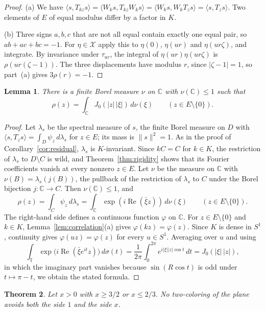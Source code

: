 \documentclass[10pt]{article}
\newtheorem{thm}{Theorem}[section]
\newtheorem{lem}[thm]{Lemma}
\theoremstyle{remark}
\newcommand{\C}{\mathbb C}
\newcommand{\T}{\mathbb T}
\DeclareMathOperator{\re}{Re}
\begin{document}
\begin{proof}
(a) We have $\langle s,T_{kz}s\rangle=\langle W_ks,T_{kz}W_ks\rangle=\langle W_ks,W_kT_zs\rangle=\langle s,T_zs\rangle$. Two elements of $E$ of equal modulus differ by a factor in $K$.

(b) Three signs $a,b,c$ that are not all equal contain exactly one equal pair, so $ab+ac+bc=-1$. For $\eta\in\mathcal X$ apply this to $\eta(0)$, $\eta(ur)$ and $\eta(ur\zeta)$, and integrate. By invariance under $\tau_{ur}$, the integral of $\eta(ur)\eta(ur\zeta)$ is $\rho(ur(\zeta-1))$. The three displacements have modulus $r$, since $|\zeta-1|=1$, so part~(a) gives $3\rho(r)=-1$.
\end{proof}

\begin{lem}\label{lem:radial}
There is a finite Borel measure $\nu$ on $\C$ with $\nu(\C)\le1$ such that
\[
 \rho(z)=\int_\C J_0(|z|\,|\xi|)\,d\nu(\xi)\qquad(z\in E\setminus\{0\}).
\]
\end{lem}

\begin{proof}
Let $\lambda_s$ be the spectral measure of $s$, the finite Borel measure on $D$ with $\langle s,T_zs\rangle=\int_D\psi_z\,d\lambda_s$ for $z\in E$; its mass is $\|s\|^2=1$. As in the proof of Corollary~\ref{cor:residual}, $\lambda_s$ is $K$-invariant. Since $kC=C$ for $k\in K$, the restriction of $\lambda_s$ to $D\setminus C$ is wild, and Theorem~\ref{thm:rigidity} shows that its Fourier coefficients vanish at every nonzero $z\in E$. Let $\nu$ be the measure on $\C$ with $\nu(B)=\lambda_s(j(B))$, the pullback of the restriction of $\lambda_s$ to $C$ under the Borel bijection $j\colon\C\to C$. Then $\nu(\C)\le1$, and
\[
 \rho(z)=\int_C\psi_z\,d\lambda_s=\int_\C\exp(i\re(\bar\xi z))\,d\nu(\xi)\qquad(z\in E\setminus\{0\}).
\]
The right-hand side defines a continuous function $\varphi$ on $\C$. For $z\in E\setminus\{0\}$ and $k\in K$, Lemma~\ref{lem:correlation}(a) gives $\varphi(kz)=\varphi(z)$. Since $K$ is dense in $S^1$, continuity gives $\varphi(uz)=\varphi(z)$ for every $u\in S^1$. Averaging over $u$ and using
\[
 \int_\T\exp\bigl(i\re(\bar\xi e^{it}z)\bigr)\,d\sigma(t)=\frac1{2\pi}\int_0^{2\pi}e^{i|\xi||z|\cos t}\,dt=J_0(|\xi|\,|z|),
\]
in which the imaginary part vanishes because $\sin(R\cos t)$ is odd under $t\mapsto\pi-t$, we obtain the stated formula.
\end{proof}

\begin{thm}\label{thm:far}
Let $x>0$ with $x\ge3/2$ or $x\le2/3$. No two-coloring of the plane avoids both the side $1$ and the side $x$.
\end{thm}
\end{document}
